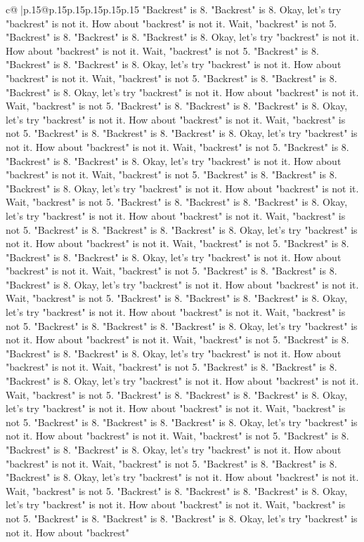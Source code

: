 \documentclass{article}
\begin{document}
{\begin{supertabular}{c@{$\;$}|p{.15\linewidth}@{}p{.15\linewidth}p{.15\linewidth}p{.15\linewidth}p{.15\linewidth}p{.15\linewidth}}
{{{"Backrest" is 8. "Backrest" is 8. Okay, let's try "backrest" is not it. How about "backrest" is not it. Wait, "backrest" is not 5. "Backrest" is 8. "Backrest" is 8. "Backrest" is 8. Okay, let's try "backrest" is not it. How about "backrest" is not it. Wait, "backrest" is not 5. "Backrest" is 8. "Backrest" is 8. "Backrest" is 8. Okay, let's try "backrest" is not it. How about "backrest" is not it. Wait, "backrest" is not 5. "Backrest" is 8. "Backrest" is 8. "Backrest" is 8. Okay, let's try "backrest" is not it. How about "backrest" is not it. Wait, "backrest" is not 5. "Backrest" is 8. "Backrest" is 8. "Backrest" is 8. Okay, let's try "backrest" is not it. How about "backrest" is not it. Wait, "backrest" is not 5. "Backrest" is 8. "Backrest" is 8. "Backrest" is 8. Okay, let's try "backrest" is not it. How about "backrest" is not it. Wait, "backrest" is not 5. "Backrest" is 8. "Backrest" is 8. "Backrest" is 8. Okay, let's try "backrest" is not it. How about "backrest" is not it. Wait, "backrest" is not 5. "Backrest" is 8. "Backrest" is 8. "Backrest" is 8. Okay, let's try "backrest" is not it. How about "backrest" is not it. Wait, "backrest" is not 5. "Backrest" is 8. "Backrest" is 8. "Backrest" is 8. Okay, let's try "backrest" is not it. How about "backrest" is not it. Wait, "backrest" is not 5. "Backrest" is 8. "Backrest" is 8. "Backrest" is 8. Okay, let's try "backrest" is not it. How about "backrest" is not it. Wait, "backrest" is not 5. "Backrest" is 8. "Backrest" is 8. "Backrest" is 8. Okay, let's try "backrest" is not it. How about "backrest" is not it. Wait, "backrest" is not 5. "Backrest" is 8. "Backrest" is 8. "Backrest" is 8. Okay, let's try "backrest" is not it. How about "backrest" is not it. Wait, "backrest" is not 5. "Backrest" is 8. "Backrest" is 8. "Backrest" is 8. Okay, let's try "backrest" is not it. How about "backrest" is not it. Wait, "backrest" is not 5. "Backrest" is 8. "Backrest" is 8. "Backrest" is 8. Okay, let's try "backrest" is not it. How about "backrest" is not it. Wait, "backrest" is not 5. "Backrest" is 8. "Backrest" is 8. "Backrest" is 8. Okay, let's try "backrest" is not it. How about "backrest" is not it. Wait, "backrest" is not 5. "Backrest" is 8. "Backrest" is 8. "Backrest" is 8. Okay, let's try "backrest" is not it. How about "backrest" is not it. Wait, "backrest" is not 5. "Backrest" is 8. "Backrest" is 8. "Backrest" is 8. Okay, let's try "backrest" is not it. How about "backrest" is not it. Wait, "backrest" is not 5. "Backrest" is 8. "Backrest" is 8. "Backrest" is 8. Okay, let's try "backrest" is not it. How about "backrest" is not it. Wait, "backrest" is not 5. "Backrest" is 8. "Backrest" is 8. "Backrest" is 8. Okay, let's try "backrest" is not it. How about "backrest" is not it. Wait, "backrest" is not 5. "Backrest" is 8. "Backrest" is 8. "Backrest" is 8. Okay, let's try "backrest" is not it. How about "backrest" is not it. Wait, "backrest" is not 5. "Backrest" is 8. "Backrest" is 8. "Backrest" is 8. Okay, let's try "backrest" is not it. How about "backrest" is not it. Wait, "backrest" is not 5. "Backrest" is 8. "Backrest" is 8. "Backrest" is 8. Okay, let's try "backrest" is not it. How about "backrest" }}}
\end{supertabular}}
\end{document}
